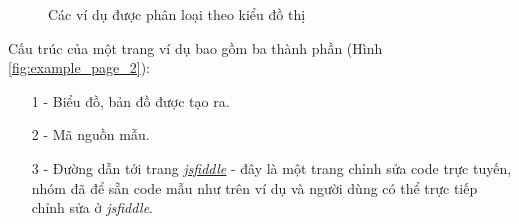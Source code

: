 \documentclass[12pt,a4paper,twoside]{article}
\begin{document}
\begin{figure}[!h]
	\begin{center}
    \caption{Các ví dụ được phân loại theo kiểu đồ thị}
    \label{fig:example_page}
	\end{center}
\end{figure}

Cấu trúc của một trang ví dụ bao gồm ba thành phần (Hình \ref{fig:example_page_2}):
\begin{itemize}
\item[1 - ] Biểu đồ, bản đồ được tạo ra.
\item[2 - ] Mã nguồn mẫu.
\item[3 - ] Đường dẫn tới trang \href{https://jsfiddle.net/}{\textit{jsfiddle}} - đây là một trang chỉnh sửa code trực tuyến, nhóm đã để sẵn code mẫu như trên ví dụ và người dùng có thể trực tiếp chỉnh sửa ở \textit{jsfiddle}.
\end{itemize}
\end{document}
